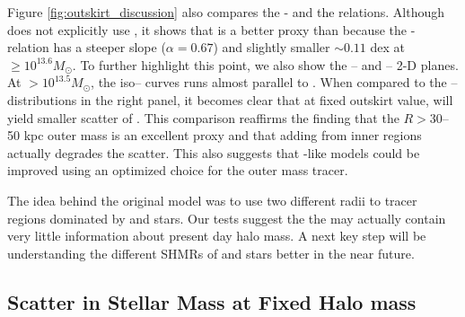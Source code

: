\documentclass[fleqn,usenatbib,useAMS]{mnras}
\begin{document}
    Figure \ref{fig:outskirt_discussion} also compares the \masap{}- and the
     relations. 
    Although \asap{} does not explicitly use , it shows that  is a
    better \mvir{} proxy than  because the \masap{}- relation has a
    steeper slope ($\alpha=0.67$) and slightly smaller \sigms$\sim 0.11$ dex at 
    \masap$\geq 10^{13.6} M_{\odot}$. 
    To further highlight this point, we also show the -- and
    -- 2-D planes.
    At \masap{}$>10^{13.5} M_{\odot}$, the iso--\masap{} curves runs almost parallel to
    .
    When compared to the -- distributions in the right panel, it becomes 
    clear that at fixed outskirt \mstar{} value,  will yield smaller scatter of 
    \masap{}.
    This comparison reaffirms the finding that the $R > 30$--50 kpc outer mass is an excellent
    \mvir{} proxy and that adding \mstar{} from inner regions actually degrades the scatter.
    This also suggests that \asap{}-like models could be improved using an optimized choice for the
    outer mass tracer.

    The idea behind the original \asap{} model was to use two different radii to tracer regions 
    dominated by \insitu{} and \exsitu{} stars. Our \topn{} tests suggest the the \insitu{} may
    actually contain very little information about present day halo mass. 
    A next key step will be understanding the different SHMRs of \insitu{} and \exsitu{} stars
    better in the near future.

\subsection{Scatter in Stellar Mass at Fixed Halo mass}
    \label{sec:sigma_mstar}
    
\end{document}
